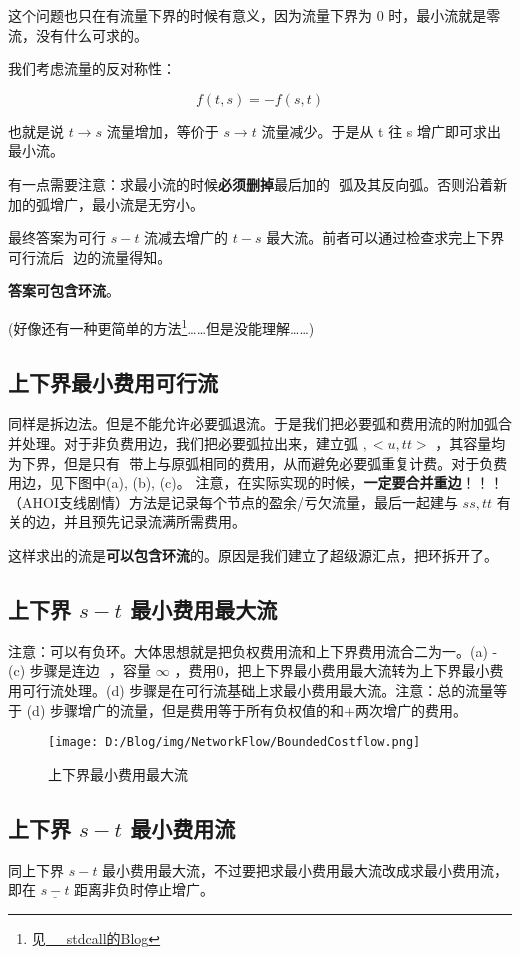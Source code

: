 \documentclass[]{ctexart}
\begin{document}
 这个问题也只在有流量下界的时候有意义，因为流量下界为 0
时，最小流就是零流，没有什么可求的。

 我们考虑流量的反对称性：

\[f(t, s) = -f(s, t)\]

 也就是说 \(t \rightarrow s\) 流量增加，等价于 \(s \rightarrow t\)
流量减少。于是从 t 往 s 增广即可求出最小流。

 有一点需要注意：求最小流的时候\textbf{必须删掉}最后加的 \(<t,s>\)
弧及其反向弧。否则沿着新加的弧增广，最小流是无穷小。

 最终答案为可行 \(s-t\) 流减去增广的 \(t-s\)
最大流。前者可以通过检查求完上下界可行流后 \(<t,s>\) 边的流量得知。

 \textbf{答案可包含环流}。

 (好像还有一种更简单的方法\footnote{见\href{http://www.cnblogs.com/mlystdcall/p/6734852.html}{\_\_stdcall的Blog}}\ldots{}\ldots{}但是没能理解\ldots{}\ldots{})

\hypertarget{header-n649}{%
\subsection{上下界最小费用可行流}\label{header-n649}}

同样是拆边法。但是不能允许必要弧退流。于是我们把必要弧和费用流的附加弧合并处理。对于非负费用边，我们把必要弧拉出来，建立弧
\(<ss, v>, <u, tt>\) ，其容量均为下界，但是只有 \(<ss,v>\)
带上与原弧相同的费用，从而避免必要弧重复计费。对于负费用边，见下图中(a),
(b), (c)。
注意，在实际实现的时候，\textbf{一定要合并重边}！！！（AHOI支线剧情）方法是记录每个节点的盈余/亏欠流量，最后一起建与
\(ss, tt\) 有关的边，并且预先记录流满所需费用。

这样求出的流是\textbf{可以包含环流}的。原因是我们建立了超级源汇点，把环拆开了。

\hypertarget{header-n655}{%
\subsection{\texorpdfstring{上下界 \(s-t\)
最小费用最大流}{上下界 s-t 最小费用最大流}}\label{header-n655}}

 注意：可以有负环。大体思想就是把负权费用流和上下界费用流合二为一。(a) -
(c) 步骤是连边 \(<t,s>\) ，容量 \(\infty\)
，费用0，把上下界最小费用最大流转为上下界最小费用可行流处理。(d)
步骤是在可行流基础上求最小费用最大流。注意：总的流量等于 (d)
步骤增广的流量，但是费用等于所有负权值的和+两次增广的费用。

\begin{figure} 
\centering
\texttt{[image: D:/Blog/img/NetworkFlow/BoundedCostflow.png]}
\caption{上下界最小费用最大流}
\end{figure}

\hypertarget{header-n660}{%
\subsection{\texorpdfstring{上下界 \(s-t\)
最小费用流}{上下界 s-t 最小费用流}}\label{header-n660}}

 同上下界 \(s-t\)
最小费用最大流，不过要把求最小费用最大流改成求最小费用流，即在
\(\underline{s-t}\) 距离非负时停止增广。
\end{document}
